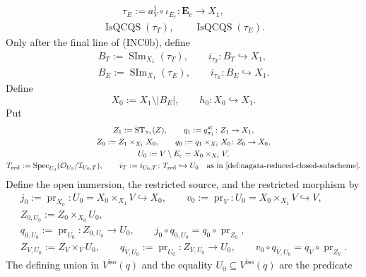 \begin{definition}
\[\begin{gathered}
    \qquad
    \tau_E:=a_V^1\circ\iota_{E_c}\colon\mathbf E_c\to X_1,\\
    \operatorname{IsQCQS}(\tau_T),\qquad
    \operatorname{IsQCQS}(\tau_E).
  \end{gathered}                                                    \tag{INC0b}
  \]
  Only after the final line of (INC0b), define
  \[
  \begin{gathered}
    B_T:=\operatorname{SIm}_{X_1}(\tau_T),\qquad
    i_{\tau_T}\colon B_T\hookrightarrow X_1,\\
    B_E:=\operatorname{SIm}_{X_1}(\tau_E),\qquad
    i_{\tau_E}\colon B_E\hookrightarrow X_1.
  \end{gathered}                                                    \tag{INC0c}
  \]
  Define
  \[
    X_0:=X_1\setminus|B_E|,\qquad h_0\colon X_0\hookrightarrow X_1.
  \]
  Put
  \[
  \begin{gathered}
    Z_1:=\operatorname{ST}_{\pi_1}(Z),\qquad
    q_1:=q^{\mathrm{st}}_{\pi_1}\colon Z_1\to X_1,\\
    Z_0:=Z_1\times_{X_1}X_0,\qquad
    q_0:=q_1\times_{X_1}X_0\colon Z_0\to X_0,\\
    U_0:=V\setminus E_c=X_0\times_{X_1}V,\\
    T_{\mathrm{red}}
      :=\operatorname{Spec}_{U_0}
        (\mathcal O_{U_0}/\mathcal I_{U_0,T}),\qquad
    i_T:=i_{U_0,T}\colon T_{\mathrm{red}}\hookrightarrow U_0
      \quad\text{as in
        \Cref{def:nagata-reduced-closed-subscheme}}.
  \end{gathered}
  \]
  Define the open immersion, the restricted source, and the restricted morphism
  by
  \[
  \begin{gathered}
    j_0:=\operatorname{pr}_{X_0}\colon
      U_0=X_0\times_{X_1}V\hookrightarrow X_0,\qquad
    v_0:=\operatorname{pr}_V\colon
      U_0=X_0\times_{X_1}V\hookrightarrow V,\\
    Z_{0,U_0}:=Z_0\times_{X_0}U_0,\\
    q_{0,U_0}:=\operatorname{pr}_{U_0}
      \colon Z_{0,U_0}\longrightarrow U_0,\qquad
    j_0\circ q_{0,U_0}=q_0\circ\operatorname{pr}_{Z_0},\\
    Z_{V,U_0}:=Z_V\times_VU_0,\qquad
    q_{V,U_0}:=\operatorname{pr}_{U_0}
      \colon Z_{V,U_0}\longrightarrow U_0,\qquad
    v_0\circ q_{V,U_0}=q_V\circ\operatorname{pr}_{Z_V}.
  \end{gathered}                                                    \tag{INC0}
  \]
  The defining union in $V^{\mathrm{iso}}(q)$ and the equality
  $U_0\subseteq V^{\mathrm{iso}}(q)$ are the predicate

\end{definition}
